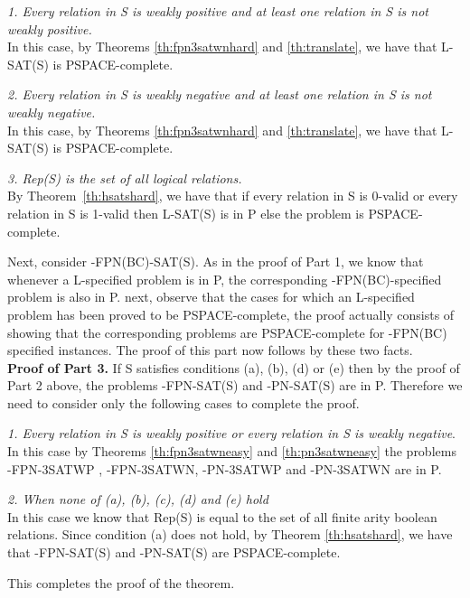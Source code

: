 \noindent
{\em 1.  Every relation in {\sf S} is weakly positive and at least one relation
in {\sf S} is not weakly positive.}\\
In this case, by Theorems \ref{th:fpn3satwnhard} and \ref{th:translate}, 
we have that {\sf L-SAT(S)} is {\sf PSPACE}-complete.

\noindent
{\em 2. Every relation in {\sf S} is weakly negative and at least one relation
in {\sf S} is not weakly negative.}\\
In this case, by Theorems \ref{th:fpn3satwnhard} and \ref{th:translate}, 
we have that {\sf L-SAT(S)} is
{\sf PSPACE}-complete.

\noindent
{\em  3. {\sf Rep(S)}  is the set of all logical relations.}\\
By Theorem~\ref{th:hsatshard}, we have that if 
every relation in {\sf S} is 0-valid or every relation 
in {\sf S} is 1-valid then {\sf L-SAT(S)} is in {\sf P}
else the problem is {\sf PSPACE}-complete.



Next, consider {-FPN(BC)-SAT(S)}. 
As in the proof of Part 1, we know that whenever a {\sf L}-specified
problem is in {\sf P}, 
the corresponding {-FPN(BC)}-specified problem is also in {\sf P}.
next, observe that the cases for which an {\sf L}-specified problem has been
proved to be {\sf PSPACE}-complete, the proof actually consists of showing that
the corresponding problems are {\sf PSPACE}-complete for {-FPN(BC)} 
specified instances. The proof of this part now follows by these two facts.\\


\noindent
{\bf Proof of Part 3.}
If {\sf S} satisfies conditions (a), (b), (d) or (e) then 
by the proof of Part 2 above, the problems
{-FPN-SAT(S)} and {-PN-SAT(S)} are in {\sf P}. 
Therefore we need to consider only the following cases to complete the proof.


\noindent
{\em 1. Every relation in {\sf S} is weakly positive or every relation in
{\sf S} is weakly negative}.\\
In this case by Theorems \ref{th:fpn3satwneasy} and \ref{th:pn3satwneasy}
the problems {-FPN-3SATWP} , {-FPN-3SATWN}, {-PN-3SATWP}  and
{-PN-3SATWN}  are in {\sf P}.

\noindent
{\em 2. When none of (a), (b), (c), (d) and (e) hold}\\
In this case we know that {\sf Rep(S)} is equal to the set
of all finite arity boolean relations. Since condition (a) does not hold,
by Theorem \ref{th:hsatshard}, we have that 
{-FPN-SAT(S)} and {-PN-SAT(S)} are {\sf PSPACE}-complete.

This completes the proof of the theorem. \hfill\QED
